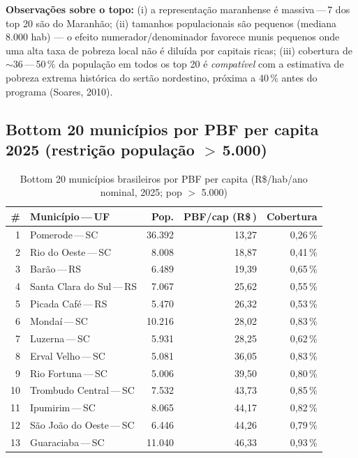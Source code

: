 \documentclass[12pt,a4paper,oneside]{article}
\newcommand{\rs}{R\$\,}
\begin{document}
\textbf{Observações sobre o topo:} (i) a representação maranhense é massiva\,---\,7
dos top 20 são do Maranhão; (ii) tamanhos populacionais são pequenos
(mediana 8.000 hab) — o efeito numerador/denominador favorece munis
pequenos onde uma alta taxa de pobreza local não é diluída por capitais
ricas; (iii) cobertura de $\sim$36\,---\,50\,\% da população em todos os top 20
é \textit{compatível} com a estimativa de pobreza extrema histórica do
sertão nordestino, próxima a 40\,\% antes do programa (Soares, 2010).

\subsection{Bottom 20 municípios por PBF per capita 2025
(restrição população $>$\,5.000)}

\begin{table}[H]\centering\small
\caption{Bottom 20 municípios brasileiros por PBF per capita
(R\$/hab/ano nominal, 2025; pop $>$ 5.000)}
\label{tab:bot20}
\begin{tabular}{rlrrr}
\toprule
\# & \textbf{Município\,---\,UF} & \textbf{Pop.} & \textbf{PBF/cap (\rs)} & \textbf{Cobertura} \\
\midrule
1 & Pomerode\,---\,SC          & 36.392 & 13{,}27 & 0{,}26\,\% \\
2 & Rio do Oeste\,---\,SC      & 8.008  & 18{,}87 & 0{,}41\,\% \\
3 & Barão\,---\,RS             & 6.489  & 19{,}39 & 0{,}65\,\% \\
4 & Santa Clara do Sul\,---\,RS & 7.067 & 25{,}62 & 0{,}55\,\% \\
5 & Picada Café\,---\,RS       & 5.470  & 26{,}32 & 0{,}53\,\% \\
6 & Mondaí\,---\,SC            & 10.216 & 28{,}02 & 0{,}83\,\% \\
7 & Luzerna\,---\,SC           & 5.931  & 28{,}25 & 0{,}62\,\% \\
8 & Erval Velho\,---\,SC       & 5.081  & 36{,}05 & 0{,}83\,\% \\
9 & Rio Fortuna\,---\,SC       & 5.006  & 39{,}50 & 0{,}80\,\% \\
10 & Trombudo Central\,---\,SC & 7.532  & 43{,}73 & 0{,}85\,\% \\
11 & Ipumirim\,---\,SC         & 8.065  & 44{,}17 & 0{,}82\,\% \\
12 & São João do Oeste\,---\,SC & 6.446 & 44{,}26 & 0{,}79\,\% \\
13 & Guaraciaba\,---\,SC       & 11.040 & 46{,}33 & 0{,}93\,\% \\

\end{tabular}
\end{table}
\end{document}

